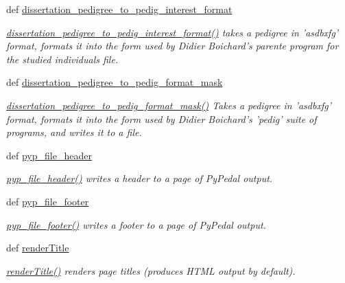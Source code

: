 \begin{CompactItemize}
def \hyperlink{namespacePyPedal_1_1pyp__io_ba3d62ddd7ba34198d64a66deeebf665}{dissertation\_\-pedigree\_\-to\_\-pedig\_\-interest\_\-format}
\begin{CompactList}\small\item\em \hyperlink{namespacePyPedal_1_1pyp__io_ba3d62ddd7ba34198d64a66deeebf665}{dissertation\_\-pedigree\_\-to\_\-pedig\_\-interest\_\-format()} takes a pedigree in 'asdbxfg' format, formats it into the form used by Didier Boichard's parente program for the studied individuals file. \item\end{CompactList}\item 
def \hyperlink{namespacePyPedal_1_1pyp__io_0515e767770eaaddb1ce12e90b2edf04}{dissertation\_\-pedigree\_\-to\_\-pedig\_\-format\_\-mask}
\begin{CompactList}\small\item\em \hyperlink{namespacePyPedal_1_1pyp__io_0515e767770eaaddb1ce12e90b2edf04}{dissertation\_\-pedigree\_\-to\_\-pedig\_\-format\_\-mask()} Takes a pedigree in 'asdbxfg' format, formats it into the form used by Didier Boichard's 'pedig' suite of programs, and writes it to a file. \item\end{CompactList}\item 
def \hyperlink{namespacePyPedal_1_1pyp__io_3e7555b76911d21bcbc6c0e64c653f42}{pyp\_\-file\_\-header}
\begin{CompactList}\small\item\em \hyperlink{namespacePyPedal_1_1pyp__io_3e7555b76911d21bcbc6c0e64c653f42}{pyp\_\-file\_\-header()} writes a header to a page of Py\-Pedal output. \item\end{CompactList}\item 
def \hyperlink{namespacePyPedal_1_1pyp__io_d0d3a34b6a9d9c2a5ab2d9f4f9316e70}{pyp\_\-file\_\-footer}
\begin{CompactList}\small\item\em \hyperlink{namespacePyPedal_1_1pyp__io_d0d3a34b6a9d9c2a5ab2d9f4f9316e70}{pyp\_\-file\_\-footer()} writes a footer to a page of Py\-Pedal output. \item\end{CompactList}\item 
def \hyperlink{namespacePyPedal_1_1pyp__io_5cb50a90451714409cb52600c9731e38}{render\-Title}
\begin{CompactList}\small\item\em \hyperlink{namespacePyPedal_1_1pyp__io_5cb50a90451714409cb52600c9731e38}{render\-Title()} renders page titles (produces HTML output by default). \item\end{CompactList}\item 

\end{CompactItemize}
